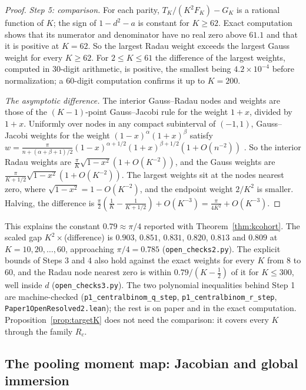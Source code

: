 \documentclass[12pt]{article}
\theoremstyle{definition}
\theoremstyle{remark}
\begin{document}
\begin{proof}
\emph{Step 5: comparison.} For each parity, $T_K/(K^2F_K)-G_K$ is a rational function of $K$; the sign of $1-d^2-a$ is constant for $K\ge62$. Exact computation shows that its numerator and denominator have no real zero above $61.1$ and that it is positive at $K=62$. So the largest Radau weight exceeds the largest Gauss weight for every $K\ge62$. For $2\le K\le61$ the difference of the largest weights, computed in 30-digit arithmetic, is positive, the smallest being $4.2\times10^{-4}$ before normalization; a 60-digit computation confirms it up to $K=200$.

\emph{The asymptotic difference.} The interior Gauss--Radau nodes and weights are those of the $(K-1)$-point Gauss--Jacobi rule for the weight $1+x$, divided by $1+x$. Uniformly over nodes in any compact subinterval of $(-1,1)$, Gauss--Jacobi weights for the weight $(1-x)^\alpha(1+x)^\beta$ satisfy $w=\frac{\pi}{n+(\alpha+\beta+1)/2}(1-x)^{\alpha+1/2}(1+x)^{\beta+1/2}(1+O(n^{-2}))$ \citep{hale2013}. So the interior Radau weights are $\frac\pi K\sqrt{1-x^2}(1+O(K^{-2}))$, and the Gauss weights are $\frac\pi{K+1/2}\sqrt{1-x^2}(1+O(K^{-2}))$. The largest weights sit at the nodes nearest zero, where $\sqrt{1-x^2}=1-O(K^{-2})$, and the endpoint weight $2/K^2$ is smaller. Halving, the difference is $\frac\pi2(\frac1K-\frac1{K+1/2})+O(K^{-3})=\frac\pi{4K^2}+O(K^{-3})$.
\end{proof}

This explains the constant $0.79\approx\pi/4$ reported with Theorem~\ref{thm:kcohort}. The scaled gap $K^2\times$(difference) is $0.903$, $0.851$, $0.831$, $0.820$, $0.813$ and $0.809$ at $K=10,20,\ldots,60$, approaching $\pi/4=0.785$ (\nolinkurl{open_checks2.py}). The explicit bounds of Steps 3 and 4 also hold against the exact weights for every $K$ from 8 to 60, and the Radau node nearest zero is within $0.79/(K-\frac12)$ of it for $K\le300$, well inside $d$ (\nolinkurl{open_checks3.py}). The two polynomial inequalities behind Step 1 are machine-checked (\texttt{p1\_centralbinom\_q\_step}, \texttt{p1\_centralbinom\_r\_step}, \nolinkurl{Paper1OpenResolved2.lean}); the rest is on paper and in the exact computation. Proposition~\ref{prop:targetK} does not need the comparison: it covers every $K$ through the family $R_c$.

\subsection{The pooling moment map: Jacobian and global immersion}\label{app:jacobian}
\end{document}
